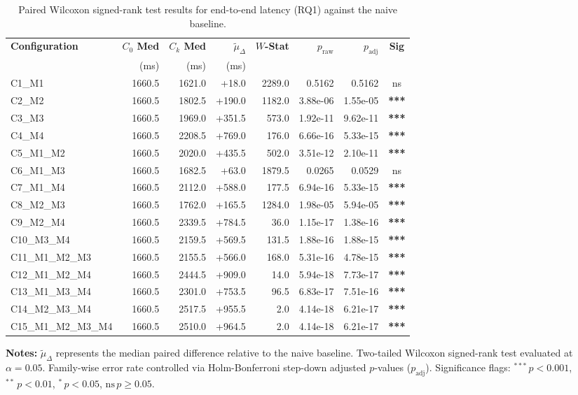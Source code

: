 \begin{table}[!htbp]
\centering
\small
\caption{Paired Wilcoxon signed-rank test results for end-to-end latency (RQ1) against the naive baseline.}
\label{tab:wilcoxon_rq1}
\begin{tabular*}{\textwidth}{@{\extracolsep{\fill}} l r r r r r r c @{}}
\toprule
\textbf{Configuration} & \textbf{$C_0$ Med} & \textbf{$C_k$ Med} & \textbf{$\tilde{\mu}_\Delta$} & \textbf{$W$-Stat} & \textbf{$p_{\text{raw}}$} & \textbf{$p_{\text{adj}}$} & \textbf{Sig} \\
 & \scriptsize{(ms)} & \scriptsize{(ms)} & \scriptsize{(ms)} & & & & \\
\midrule
C1\_M1 & 1660.5 & 1621.0 & +18.0 & 2289.0 & 0.5162 & 0.5162 & ns \\
C2\_M2 & 1660.5 & 1802.5 & +190.0 & 1182.0 & 3.88e-06 & 1.55e-05 & \textbf{***} \\
C3\_M3 & 1660.5 & 1969.0 & +351.5 & 573.0 & 1.92e-11 & 9.62e-11 & \textbf{***} \\
C4\_M4 & 1660.5 & 2208.5 & +769.0 & 176.0 & 6.66e-16 & 5.33e-15 & \textbf{***} \\
C5\_M1\_M2 & 1660.5 & 2020.0 & +435.5 & 502.0 & 3.51e-12 & 2.10e-11 & \textbf{***} \\
C6\_M1\_M3 & 1660.5 & 1682.5 & +63.0 & 1879.5 & 0.0265 & 0.0529 & ns \\
C7\_M1\_M4 & 1660.5 & 2112.0 & +588.0 & 177.5 & 6.94e-16 & 5.33e-15 & \textbf{***} \\
C8\_M2\_M3 & 1660.5 & 1762.0 & +165.5 & 1284.0 & 1.98e-05 & 5.94e-05 & \textbf{***} \\
C9\_M2\_M4 & 1660.5 & 2339.5 & +784.5 & 36.0 & 1.15e-17 & 1.38e-16 & \textbf{***} \\
C10\_M3\_M4 & 1660.5 & 2159.5 & +569.5 & 131.5 & 1.88e-16 & 1.88e-15 & \textbf{***} \\
C11\_M1\_M2\_M3 & 1660.5 & 2155.5 & +566.0 & 168.0 & 5.31e-16 & 4.78e-15 & \textbf{***} \\
C12\_M1\_M2\_M4 & 1660.5 & 2444.5 & +909.0 & 14.0 & 5.94e-18 & 7.73e-17 & \textbf{***} \\
C13\_M1\_M3\_M4 & 1660.5 & 2301.0 & +753.5 & 96.5 & 6.83e-17 & 7.51e-16 & \textbf{***} \\
C14\_M2\_M3\_M4 & 1660.5 & 2517.5 & +955.5 & 2.0 & 4.14e-18 & 6.21e-17 & \textbf{***} \\
C15\_M1\_M2\_M3\_M4 & 1660.5 & 2510.0 & +964.5 & 2.0 & 4.14e-18 & 6.21e-17 & \textbf{***} \\
\bottomrule
\end{tabular*}
\vspace{0.5em}
\parbox{\textwidth}{\footnotesize
\textbf{Notes:} $\tilde{\mu}_\Delta$ represents the median paired difference relative to the naive baseline. Two-tailed Wilcoxon signed-rank test evaluated at $\alpha = 0.05$. Family-wise error rate controlled via Holm-Bonferroni step-down adjusted $p$-values ($p_{\text{adj}}$). Significance flags: $^{***}\,p < 0.001$, $^{**}\,p < 0.01$, $^{*}\,p < 0.05$, $\text{ns}\,p \ge 0.05$.}
\end{table}
